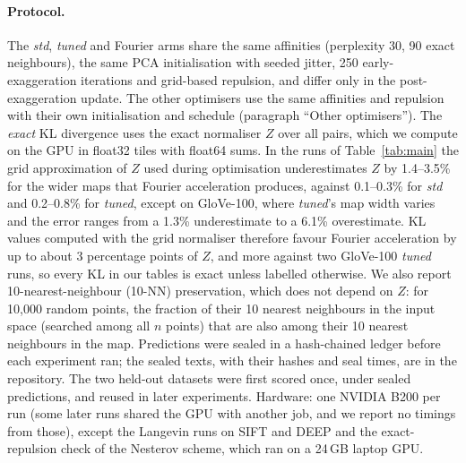 \documentclass[11pt]{article}
\begin{document}
\paragraph{Protocol.} The \emph{std}, \emph{tuned} and Fourier arms share the same affinities (perplexity 30, 90 exact
neighbours), the same PCA initialisation with seeded jitter, 250 early-exaggeration iterations and grid-based
repulsion, and differ only in the post-exaggeration update. The other optimisers use the same affinities and
repulsion with their own initialisation and schedule (paragraph ``Other optimisers''). The \emph{exact} KL divergence uses the exact normaliser $Z$ over all
pairs, which we compute on the GPU in float32 tiles with float64 sums. In the runs of Table~\ref{tab:main} the grid
approximation of $Z$ used during optimisation underestimates $Z$ by 1.4--3.5\% for the wider maps that Fourier
acceleration produces, against 0.1--0.3\% for \emph{std} and 0.2--0.8\% for \emph{tuned}, except on GloVe-100, where
\emph{tuned}'s map width varies and the error ranges from a 1.3\% underestimate to a 6.1\% overestimate. KL values
computed with the grid normaliser therefore favour Fourier acceleration by up to about 3 percentage points of $Z$,
and more against two GloVe-100 \emph{tuned} runs, so every KL in our tables is exact unless labelled otherwise. We also
report 10-nearest-neighbour (10-NN) preservation, which does not depend on $Z$: for 10{,}000 random points, the
fraction of their 10 nearest neighbours in the input space (searched among all $n$ points) that are also among their
10 nearest neighbours in the map. Predictions were sealed in a hash-chained ledger before each experiment ran; the
sealed texts, with their hashes and seal times, are in the repository. The two held-out datasets were first scored
once, under sealed predictions, and reused in later experiments. Hardware: one NVIDIA B200 per run (some later runs shared the GPU
with another job, and we report no timings from those), except the Langevin runs on SIFT and DEEP and the
exact-repulsion check of the Nesterov scheme, which ran on a 24\,GB laptop GPU.
\end{document}

